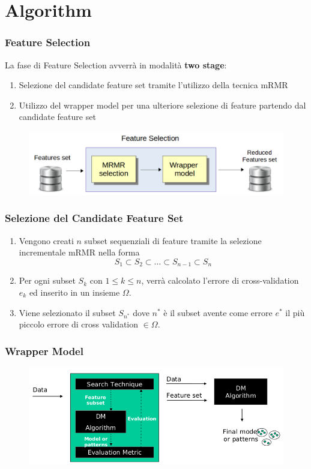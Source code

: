 \documentclass{beamer}
\begin{document}
\section{Algorithm}
\begin{frame}
	\frametitle{Feature Selection}
	La fase di Feature Selection avverrà in modalità \textbf{two stage}:
	\begin{enumerate}
		\item Selezione del candidate feature set tramite l'utilizzo della tecnica mRMR
		\item Utilizzo del wrapper model per una ulteriore selezione di feature partendo dal candidate feature set
	\end{enumerate}
	\begin{figure}[htb]
		\includegraphics[width=.9\textwidth]{figure/twostage.png}
	\end{figure}
\end{frame}
\begin{frame}
	\frametitle{Selezione del Candidate Feature Set}
	\begin{enumerate}
		\item Vengono creati $n$ subset sequenziali di feature tramite la selezione incrementale mRMR nella forma
		$$S_1 \subset S_2 \subset \dots \subset S_{n-1} \subset S_n $$
		\item Per ogni subset $S_k$ con $1 \leq k \leq n$, verrà calcolato l'errore di cross-validation $e_k$ ed inserito in un insieme $\Omega$.
		\item Viene selezionato il subset $S_{n^*}$ dove $n^*$ è il subset avente come errore $e^*$ il più piccolo errore di cross validation $\in \Omega$.
	\end{enumerate}
\end{frame}

\begin{frame}
	\frametitle{Wrapper Model}
	
\begin{figure}[htb]
	\vspace{-0.2cm}
	\includegraphics[width=.70\textwidth]{figure/wrapper.png}
\end{figure}
\end{frame}
\end{document}

